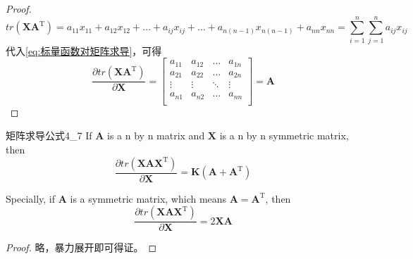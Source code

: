 \documentclass[withoutpreface,bwprint]{NoteBook}
\begin{document}
\begin{proof}
\begin{equation}
    \label{eq:计算矩阵相乘后的迹}
    tr(\mathbf{X}\mathbf{A}^\mathrm{T})
    =a_{11} x_{11} + a_{12} x_{12} + \dots + a_{ij} x_{ij} + \dots + a_{n(n-1)} x_{n(n-1)} + a_{nn} x_{nn}
    =\sum_{i=1}^{n} \sum_{j=1}^{n} a_{ij} x_{ij}
\end{equation}
代入\cref{eq:标量函数对矩阵求导}，可得
\begin{equation}
    \frac{\partial tr(\mathbf{X}\mathbf{A}^\mathrm{T})}{\partial \mathbf{X}}
    =
    \begin{bmatrix}
        a_{11} & a_{12} & \dots & a_{1n} \\
        a_{21} & a_{22} & \dots & a_{2n} \\
        \vdots & \vdots & \ddots & \vdots \\
        a_{n1} & a_{n2} & \dots & a_{nn} \\
    \end{bmatrix}
    = \mathbf{A}
\end{equation}

\end{proof}


\begin{matrixDerivativeEquation}
    {}
    {矩阵求导公式4_7}
    If
    $\mathbf{A}$ is a n by n matrix and 
    $\mathbf{X}$ is a n by n symmetric matrix, then
    $$
    \frac{\partial tr(\mathbf{X}\mathbf{A} \mathbf{X}^\mathrm{T})}{\partial \mathbf{X}}
    =
    \mathbf{K}(\mathbf{A}+\mathbf{A}^\mathrm{T})
    $$

    Specially, if $\mathbf{A}$ is a symmetric matrix, which means $\mathbf{A}=\mathbf{A}^\mathrm{T}$,
    then
    $$
    \frac{\partial tr(\mathbf{X}\mathbf{A} \mathbf{X}^\mathrm{T})}{\partial \mathbf{X}}
    = 
    2 \mathbf{X} \mathbf{A}
    $$

\end{matrixDerivativeEquation}

\begin{proof}
    略，暴力展开即可得证。
\end{proof}

\end{document}
